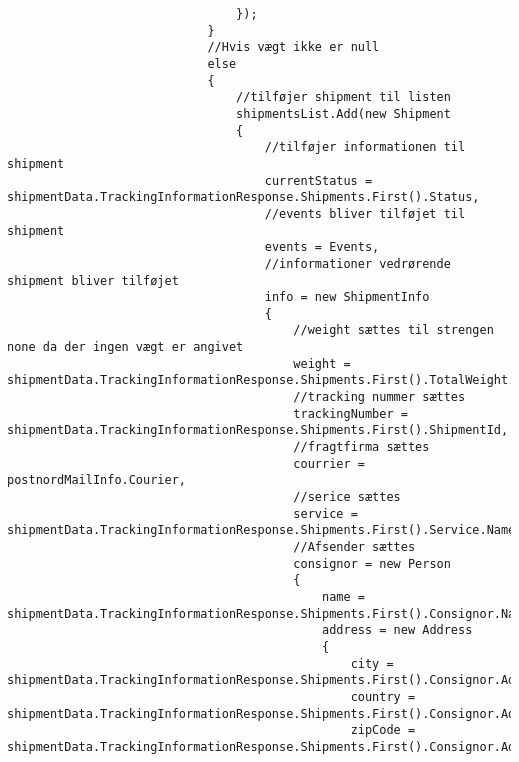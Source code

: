 \begin{verbatim}
                                });
                            }
                            //Hvis vægt ikke er null
                            else
                            {
                                //tilføjer shipment til listen
                                shipmentsList.Add(new Shipment
                                {
                                    //tilføjer informationen til shipment
                                    currentStatus = shipmentData.TrackingInformationResponse.Shipments.First().Status,
                                    //events bliver tilføjet til shipment
                                    events = Events,
                                    //informationer vedrørende shipment bliver tilføjet
                                    info = new ShipmentInfo
                                    {
                                        //weight sættes til strengen none da der ingen vægt er angivet
                                        weight = shipmentData.TrackingInformationResponse.Shipments.First().TotalWeight.Value,
                                        //tracking nummer sættes
                                        trackingNumber = shipmentData.TrackingInformationResponse.Shipments.First().ShipmentId,
                                        //fragtfirma sættes
                                        courrier = postnordMailInfo.Courier,
                                        //serice sættes
                                        service = shipmentData.TrackingInformationResponse.Shipments.First().Service.Name,
                                        //Afsender sættes
                                        consignor = new Person
                                        {
                                            name = shipmentData.TrackingInformationResponse.Shipments.First().Consignor.Name,
                                            address = new Address
                                            {
                                                city = shipmentData.TrackingInformationResponse.Shipments.First().Consignor.Address.City,
                                                country = shipmentData.TrackingInformationResponse.Shipments.First().Consignor.Address.Country,
                                                zipCode = shipmentData.TrackingInformationResponse.Shipments.First().Consignor.Address.PostCode.ToString(),
        

\end{verbatim}
